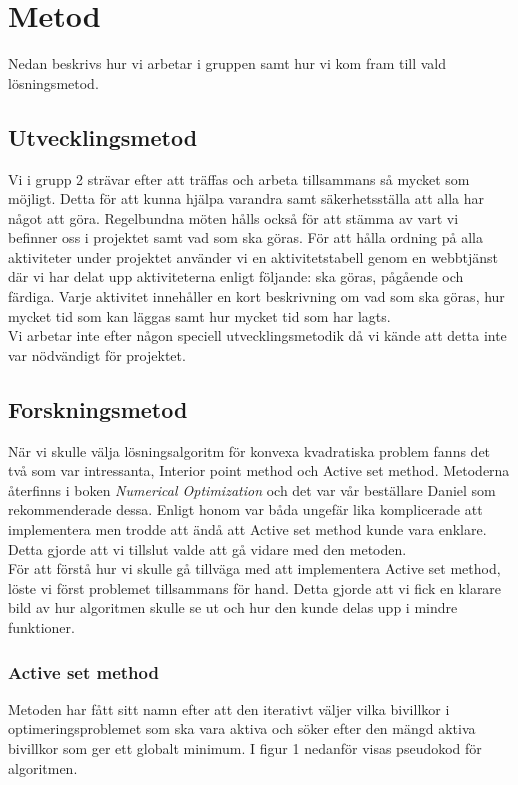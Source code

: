 \section{Metod}
Nedan beskrivs hur vi arbetar i gruppen samt hur vi kom fram till vald lösningsmetod. 

\subsection{Utvecklingsmetod}
Vi i grupp 2 strävar efter att träffas och arbeta tillsammans så mycket som möjligt. Detta för att kunna hjälpa varandra samt säkerhetsställa att alla har något att göra. Regelbundna möten hålls också för att stämma av vart vi befinner oss i projektet samt vad som ska göras. För att hålla ordning på alla aktiviteter under projektet använder vi en aktivitetstabell genom en webbtjänst där vi har delat upp aktiviteterna enligt följande: ska göras, pågående och färdiga. Varje aktivitet innehåller en kort beskrivning om vad som ska göras, hur mycket tid som kan läggas samt hur mycket tid som har lagts. 
\\
Vi arbetar inte efter någon speciell utvecklingsmetodik då vi kände att detta inte var nödvändigt för projektet.      

\subsection{Forskningsmetod}
När vi skulle välja lösningsalgoritm för konvexa kvadratiska problem fanns det två som var intressanta, Interior point method och Active set method. Metoderna återfinns i boken \emph{Numerical Optimization} och det var vår beställare Daniel som rekommenderade dessa. Enligt honom var båda ungefär lika komplicerade att implementera men trodde att ändå att Active set method kunde vara enklare. Detta gjorde att vi tillslut valde att gå vidare med den metoden. 
\\
För att förstå hur vi skulle gå tillväga med att implementera Active set method, löste vi först problemet tillsammans för hand. Detta gjorde att vi fick en klarare bild av hur algoritmen skulle se ut och hur den kunde delas upp i mindre funktioner.     

\subsubsection{Active set method}   
Metoden har fått sitt namn efter att den iterativt väljer vilka bivillkor i optimeringsproblemet som ska vara aktiva och söker efter den mängd aktiva bivillkor som ger ett globalt minimum. I figur 1 nedanför visas pseudokod för algoritmen.

